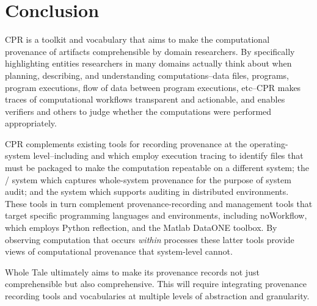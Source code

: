 \section{Conclusion}

CPR is a toolkit and vocabulary that aims to make the computational provenance of artifacts comprehensible by domain researchers. By specifically highlighting entities researchers in many domains actually think about when planning, describing, and understanding computations--data files, programs, program executions, flow of data between program executions, etc--CPR makes traces of computational workflows transparent and actionable, and enables verifiers and others to judge whether the computations were performed appropriately.

CPR complements existing tools for recording provenance at the operating-system level--including  and  which employ execution tracing to identify files that must be packaged to make the computation repeatable on a different system; the / system which captures whole-system provenance for the purpose of system audit; and the  system which supports auditing in distributed environments. These tools in turn complement provenance-recording and management tools that target specific programming languages and environments, including noWorkflow, which employs Python reflection, and the Matlab DataONE toolbox. By observing computation that occurs \emph{within} processes these latter tools provide views of computational provenance that system-level cannot.

Whole Tale ultimately aims to make its provenance records not just comprehensible but also comprehensive. This will require integrating provenance recording tools and vocabularies at multiple levels of abstraction and granularity.

